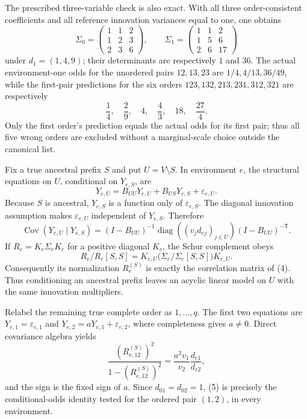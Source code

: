 The prescribed three-variable check is also exact.  With all three order-consistent coefficients and all reference innovation variances equal to one, one obtains
\[
 \Sigma_0=\begin{pmatrix}1&1&2\\1&2&3\\2&3&6\end{pmatrix},
 \qquad
 \Sigma_1=\begin{pmatrix}1&1&2\\1&5&6\\2&6&17\end{pmatrix}
\]
under \(d_1=(1,4,9)\); their determinants are respectively \(1\) and \(36\).  The actual environment-one odds for the unordered pairs \(12,13,23\) are \(1/4,4/13,36/49\), while the first-pair predictions for the six orders \(123,132,213,231,312,321\) are respectively
\[
 \frac14,\quad\frac29,\quad4,\quad\frac43,\quad18,\quad\frac{27}{4}.
\]
Only the first order's prediction equals the actual odds for its first pair; thus all five wrong orders are excluded without a marginal-scale choice outside the canonical list.

Fix a true ancestral prefix \(S\) and put \(U=V\setminus S\).  In environment \(e\), the structural equations on \(U\), conditional on \(Y_{e,S}\), are
\[
 Y_{e,U}=B_{UU}Y_{e,U}+B_{US}Y_{e,S}+\varepsilon_{e,U}.
\]
Because \(S\) is ancestral, \(Y_{e,S}\) is a function only of \(\varepsilon_{e,S}\).  The diagonal innovation assumption makes \(\varepsilon_{e,U}\) independent of \(Y_{e,S}\).  Therefore
\[
 \operatorname{Cov}(Y_{e,U}\mid Y_{e,S})
 =(I-B_{UU})^{-1}\operatorname{diag}((v_jd_{ej})_{j\in U})
 (I-B_{UU})^{-\mathsf T}. \tag{4}
\]
If \(R_e=K_e\Sigma_eK_e\) for a positive diagonal \(K_e\), the Schur complement obeys
\[
 R_e/R_e[S,S]
 =K_{e,U}\bigl(\Sigma_e/\Sigma_e[S,S]\bigr)K_{e,U}.
\]
Consequently its normalization \(R_e^{(S)}\) is exactly the correlation matrix of (4).  Thus conditioning an ancestral prefix leaves an acyclic linear model on \(U\) with the same innovation multipliers.

Relabel the remaining true complete order as \(1,\ldots,q\).  The first two equations are
\(Y_{e,1}=\varepsilon_{e,1}\) and
\(Y_{e,2}=aY_{e,1}+\varepsilon_{e,2}\), where completeness gives \(a\ne0\).  Direct covariance algebra yields
\[
 \frac{(R_{e,12}^{(S)})^2}{1-(R_{e,12}^{(S)})^2}
 =\frac{a^2v_1}{v_2}\frac{d_{e1}}{d_{e2}}, \tag{5}
\]
and the sign is the fixed sign of \(a\).  Since \(d_{01}=d_{02}=1\), (5) is precisely the conditional-odds identity tested for the ordered pair \((1,2)\), in every environment.

